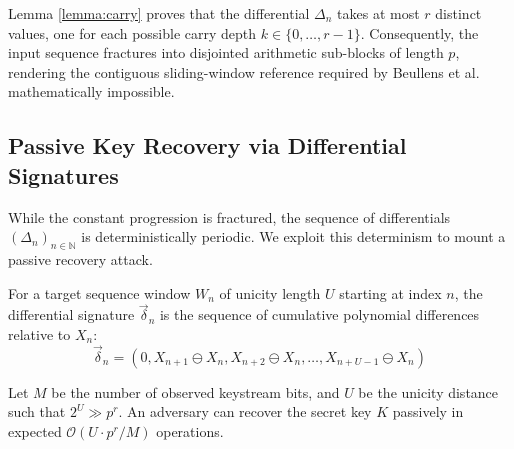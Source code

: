 \documentclass[runningheads]{llncs}
\begin{document}
Lemma \ref{lemma:carry} proves that the differential $\Delta_n$ takes at most $r$ distinct values, one for each possible carry depth $k \in \{0, \ldots, r-1\}$. Consequently, the input sequence fractures into disjointed arithmetic sub-blocks of length $p$, rendering the contiguous sliding-window reference required by Beullens et al.\ \cite{beullens2019} mathematically impossible.

\subsection{Passive Key Recovery via Differential Signatures}
While the constant progression is fractured, the sequence of differentials $(\Delta_n)_{n \in \mathbb{N}}$ is deterministically periodic. We exploit this determinism to mount a passive recovery attack.

\begin{definition} \label{def:signature}
For a target sequence window $W_n$ of unicity length $U$ starting at index $n$, the differential signature $\vec{\delta}_n$ is the sequence of cumulative polynomial differences relative to $X_n$:
\begin{equation*}
    \vec{\delta}_n = (0, X_{n+1} \ominus X_n, X_{n+2} \ominus X_n, \dots, X_{n+U-1} \ominus X_n)
\end{equation*}
\end{definition}

\begin{theorem} \label{thm:passive}
Let $M$ be the number of observed keystream bits, and $U$ be the unicity distance such that $2^U \gg p^r$. An adversary can recover the secret key $K$ passively in expected $\mathcal{O}(U \cdot p^r/M)$ operations.
\end{theorem}
\end{document}
